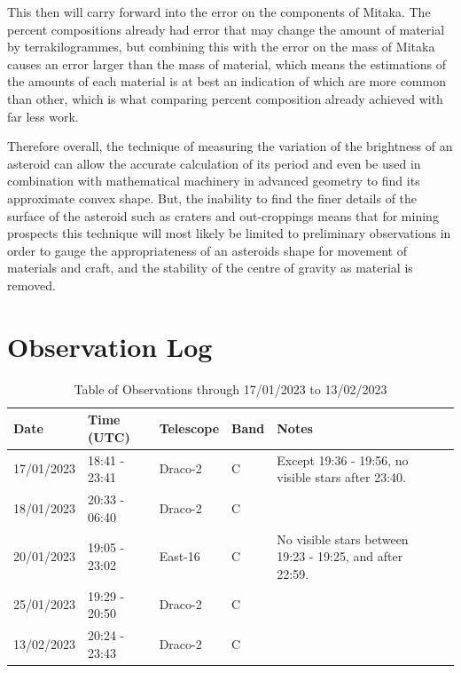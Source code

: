 \documentclass[10pt,twocolumn]{revtex4}    %
\begin{document}
This then will carry forward into the error on the components of Mitaka. The percent compositions already had error that may change the amount of material by terrakilogrammes, but combining this with the error on the mass of Mitaka causes an error larger than the mass of material, which means the estimations of the amounts of each material is at best an indication of which are more common than other, which is what comparing percent composition already achieved with far less work.

Therefore overall, the technique of measuring the variation of the brightness of an asteroid can allow the accurate calculation of its period and even be used in combination with mathematical machinery in advanced geometry to find its approximate convex shape. But, the inability to find the finer details of the surface of the asteroid such as craters and out-croppings means that for mining prospects this technique will most likely be limited to preliminary observations in order to gauge the appropriateness of an asteroids shape for movement of materials and craft, and the stability of the centre of gravity as material is removed. 





\clearpage

\section*{Observation Log}

\begin{table}[h]
    \centering
    \begin{tabular}{|l|l|l|l|l|l|}\hline
        Date & Time (UTC) & Telescope & Band & Notes \\ \hline
        17/01/2023 &  18:41 - 23:41 & Draco-2 & C & Except 19:36 - 19:56, no visible stars after 23:40. \\
        18/01/2023 & 20:33 - 06:40 & Draco-2 & C & \\
        20/01/2023 & 19:05 - 23:02 & East-16 & C & No visible stars between 19:23 - 19:25, and after 22:59. \\
        25/01/2023 & 19:29 - 20:50 & Draco-2 & C & \\
        13/02/2023 & 20:24 - 23:43 & Draco-2 & C & \\ \hline
    \end{tabular}
    \caption{Table of Observations through 17/01/2023 to 13/02/2023}
    \label{tab:obsTable}
\end{table}
\end{document}
